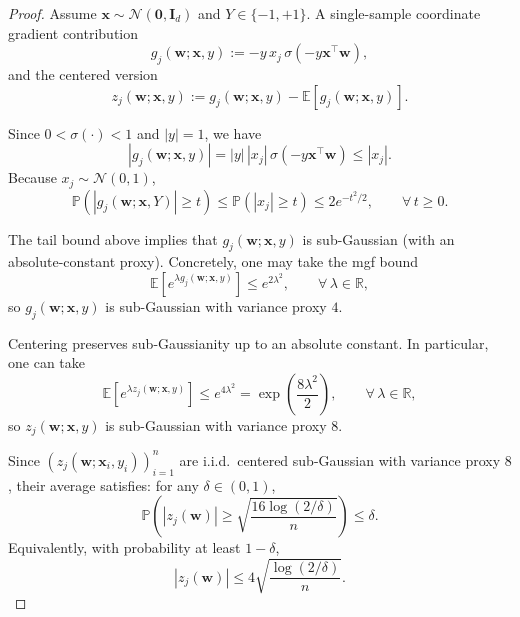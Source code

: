 \documentclass{article}
\theoremstyle{plain}
\theoremstyle{definition}
\theoremstyle{remark}
\begin{document}
{\begin{proof}
Assume $\boldsymbol x\sim\mathcal N(\boldsymbol 0,\boldsymbol I_d)$ and $Y\in\{-1,+1\}$.
 A single-sample coordinate
gradient contribution
\[
g_j(\boldsymbol w;\boldsymbol x,y):=-y\,x_j\,\sigma(-y\boldsymbol x^\top \boldsymbol w),
\]
and the centered version
\[
z_j(\boldsymbol w;\boldsymbol x,y):=g_j(\boldsymbol w;\boldsymbol x,y)-\mathbb E\!\left[g_j(\boldsymbol w;\boldsymbol x,y)\right].
\]


Since $0<\sigma(\cdot)<1$ and $|y|=1$, we have
\[
|g_j(\boldsymbol w;\boldsymbol x,y)|
=
|y|\,|x_j|\,\sigma(-y\boldsymbol x^\top \boldsymbol w)
\le
|x_j|.
\]
Because $x_j\sim\mathcal N(0,1)$,
\[
\mathbb P\!\left(|g_j(\boldsymbol w;\boldsymbol x,Y)|\ge t\right)
\le
\mathbb P(|x_j|\ge t)
\le
2e^{-t^2/2},
\qquad \forall\,t\ge 0.
\]

The tail bound above implies that $g_j(\boldsymbol w;\boldsymbol x,y)$ is sub-Gaussian
(with an absolute-constant proxy). Concretely, one may take the mgf bound
\[
\mathbb E\!\left[e^{\lambda g_j(\boldsymbol w;\boldsymbol x,y)}\right]
\le
e^{2\lambda^2},
\qquad \forall\,\lambda\in\mathbb R,
\]
so $g_j(\boldsymbol w;\boldsymbol x,y)$ is sub-Gaussian with variance proxy $4$.

Centering preserves sub-Gaussianity up to an absolute constant. In particular, one can take
\[
\mathbb E\!\left[e^{\lambda z_j(\boldsymbol w;\boldsymbol x,y)}\right]
\le
e^{4\lambda^2}
=
\exp\!\left(\frac{8\lambda^2}{2}\right),
\qquad \forall\,\lambda\in\mathbb R,
\]
so $z_j(\boldsymbol w;\boldsymbol x,y)$ is sub-Gaussian with variance proxy $8$.

Since $(z_j(\boldsymbol w;\boldsymbol x_i,y_i))_{i=1}^n$ are i.i.d.\ centered sub-Gaussian
with variance proxy $8$, their average satisfies: for any $\delta\in(0,1)$,
\[
\mathbb P\!\left(
|z_j(\boldsymbol w)|
\ge
\sqrt{\frac{16\log(2/\delta)}{n}}
\right)
\le
\delta.
\]
Equivalently, with probability at least $1-\delta$,
\[
|z_j(\boldsymbol w)|
\le
4\sqrt{\frac{\log(2/\delta)}{n}}.
\]


\end{proof}}
\end{document}
